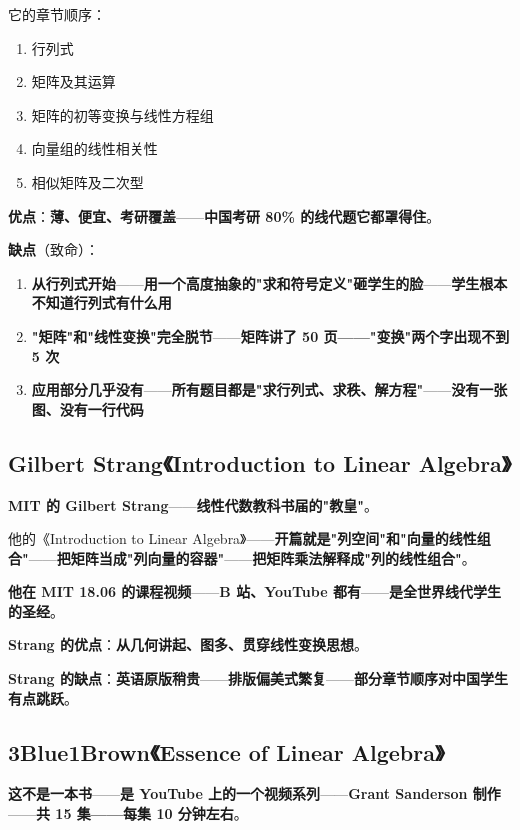 它的章节顺序：

\begin{enumerate}
\item 行列式
\item 矩阵及其运算
\item 矩阵的初等变换与线性方程组
\item 向量组的线性相关性
\item 相似矩阵及二次型
\end{enumerate}

\textbf{优点}：\textbf{薄、便宜、考研覆盖}——\textbf{中国考研 80\% 的线代题它都罩得住}。

\textbf{缺点}（致命）：

\begin{enumerate}
\item \textbf{从行列式开始}——\textbf{用一个高度抽象的"求和符号定义"砸学生的脸}——\textbf{学生根本不知道行列式有什么用}
\item \textbf{"矩阵"和"线性变换"完全脱节}——\textbf{矩阵讲了 50 页——"变换"两个字出现不到 5 次}
\item \textbf{应用部分几乎没有}——\textbf{所有题目都是"求行列式、求秩、解方程"}——\textbf{没有一张图、没有一行代码}
\end{enumerate}

\subsection{Gilbert Strang《Introduction to Linear Algebra》}

\textbf{MIT 的 Gilbert Strang}——\textbf{线性代数教科书届的"教皇"}。

他的《Introduction to Linear Algebra》——\textbf{开篇就是"列空间"和"向量的线性组合"}——\textbf{把矩阵当成"列向量的容器"}——\textbf{把矩阵乘法解释成"列的线性组合"}。

\textbf{他在 MIT 18.06 的课程视频}——\textbf{B 站、YouTube 都有}——\textbf{是全世界线代学生的圣经}。

\textbf{Strang 的优点}：\textbf{从几何讲起、图多、贯穿线性变换思想}。

\textbf{Strang 的缺点}：\textbf{英语原版稍贵}——\textbf{排版偏美式繁复}——\textbf{部分章节顺序对中国学生有点跳跃}。

\subsection{3Blue1Brown《Essence of Linear Algebra》}

\textbf{这不是一本书}——\textbf{是 YouTube 上的一个视频系列}——\textbf{Grant Sanderson 制作}——\textbf{共 15 集——每集 10 分钟左右}。

